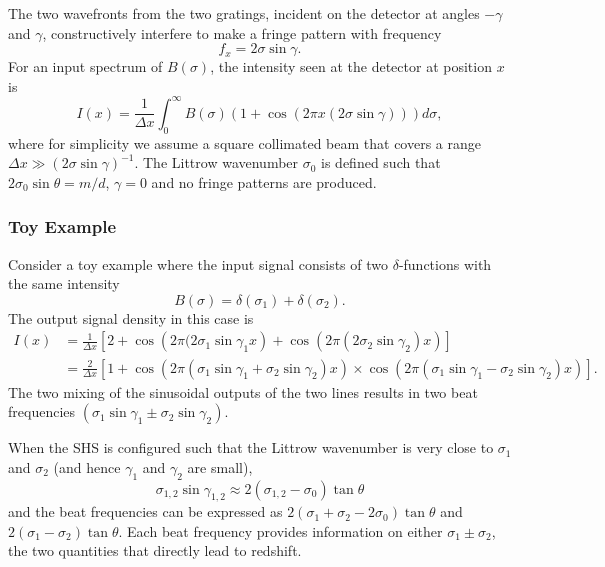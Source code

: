 \documentclass[preprint]{aastex}
\begin{document}
The two wavefronts from the two gratings, incident on the detector at angles $-\gamma$ and $\gamma$, constructively interfere to make a fringe
pattern with  frequency
\begin{equation}
f_x=2\sigma\sin{\gamma}.
\end{equation}
For an input spectrum of $B(\sigma)$, the intensity seen at the detector at position $x$ is
\begin{equation}
I(x)=\frac{1}{\Delta x}\int_{0}^{\infty} B(\sigma)\left(1+\cos{\left(2 \pi x (2\sigma \sin{\gamma})\right)}\right)d\sigma,
\end{equation}
where for simplicity we assume a square collimated beam that covers
a range  $\Delta x \gg \left(2\sigma \sin{\gamma}\right)^{-1}$.
The Littrow wavenumber $\sigma_0$ is defined such that $2\sigma_0\sin{\theta}=m/d$, $\gamma=0$ and no fringe patterns are produced.

\subsubsection{Toy Example}
\label{toy:sec}
Consider a toy example where the input signal consists of two $\delta$-functions with the same intensity
\begin{equation}
B(\sigma)=\delta(\sigma_1)+\delta(\sigma_2).
\end{equation}
The output signal density in this case is
\begin{align}
I(x)&=\frac{1}{\Delta x}\left[2+ \cos{\left(2 \pi (2\sigma_1  \sin{\gamma_1}x \right)}+ \cos{\left(2\pi (2  \sigma_2  \sin{\gamma_2})x \right)}\right]\\
&=\frac{2}{\Delta x}\left[1+ \cos{\left(2 \pi  (\sigma_1  \sin{\gamma_1}+ \sigma_2  \sin{\gamma_2})x \right)}\times\cos{\left(2\pi  (\sigma_1  \sin{\gamma_1}- \sigma_2  \sin{\gamma_2})x\right)}\right].
\end{align}
The two mixing of the sinusoidal outputs of the two lines results in two beat frequencies $(\sigma_1  \sin{\gamma_1}\pm\sigma_2  \sin{\gamma_2})$.

When the SHS is configured such that the Littrow wavenumber is
very close to $\sigma_1$ and $\sigma_2$ (and hence $\gamma_1$ and $\gamma_2$
are small),
\begin{equation}
\sigma_{1,2}\sin{\gamma_{1,2}} \approx  2(\sigma_{1,2}-\sigma_0) \tan{\theta}
\end{equation}
and the beat frequencies can be expressed as
$2(\sigma_1+\sigma_2-2\sigma_0)\tan{\theta}$ and $2(\sigma_1-\sigma_2)\tan{\theta}$.
Each beat frequency provides information on either 
$\sigma_1\pm \sigma_2$, the two quantities that directly lead to redshift.
\end{document}

